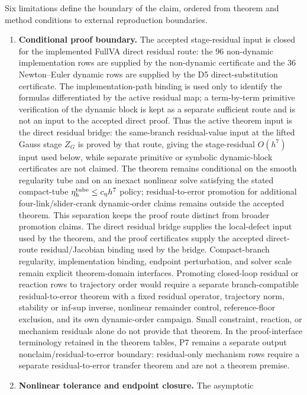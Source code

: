 \documentclass[preprint,12pt]{elsarticle}
\begin{document}
Six limitations define the boundary of the claim, ordered from theorem and
method conditions to external reproduction boundaries.
\begin{enumerate}
  \item \textbf{Conditional proof boundary.} The accepted stage-residual input
  is closed for the implemented FullVA direct residual route: the 96
  non-dynamic implementation rows are supplied by the non-dynamic certificate
  and the 36 Newton--Euler dynamic rows are supplied by the D5
  direct-substitution certificate. The implementation-path binding is used
  only to identify the formulas differentiated by the active residual map;
  a term-by-term primitive verification of the dynamic block is kept as a
  separate sufficient route and is not an input to the accepted direct proof.
  Thus the active theorem input is the direct residual bridge: the
  same-branch residual-value input at the lifted Gauss stage \(Z_G\) is proved
  by that route, giving the stage-residual \(O(h^7)\) input used below, while separate
  primitive or symbolic dynamic-block certificates are not claimed. The theorem remains
  conditional on the smooth regularity tube and on an inexact nonlinear solve
  satisfying the stated compact-tube \(\eta_h^{\rm tube}\le c_\eta h^7\)
  policy; residual-to-error promotion for additional
  four-link/slider-crank dynamic-order claims remains outside the accepted
  theorem.
  This separation keeps the proof route distinct from broader promotion
  claims. The direct residual bridge supplies the local-defect input used by
  the theorem, and the proof certificates supply the accepted direct-route
  residual/Jacobian binding used by the bridge. Compact-branch regularity,
  implementation binding,
  endpoint perturbation, and solver scale remain explicit theorem-domain
  interfaces. Promoting closed-loop residual or reaction rows to trajectory
  order would require a separate branch-compatible residual-to-error theorem
  with a fixed residual operator, trajectory norm, stability or inf-sup
  inverse, nonlinear remainder control, reference-floor exclusion, and its own
  dynamic-order campaign. Small constraint, reaction, or mechanism residuals
alone do not provide that theorem. In the proof-interface terminology
retained in the theorem tables, P7 remains a separate output nonclaim/residual-to-error boundary: residual-only mechanism rows require a separate residual-to-error transfer theorem and are not a theorem premise.
  \item \textbf{Nonlinear tolerance and endpoint closure.} The asymptotic

\end{enumerate}
\end{document}
